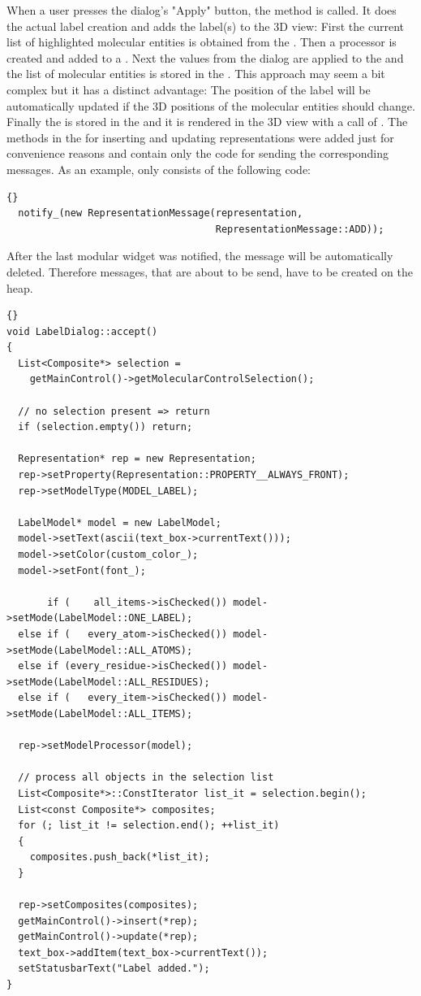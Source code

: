 \vspace{0.5cm}
When a user presses the dialog's "Apply" button, the method  is called.
It does the actual label creation and adds the label(s) to the 3D view:
First the current list of highlighted molecular entities is obtained from
the .
Then a  processor is created and added to a .
Next the values from the dialog are applied to the  and the
list of molecular entities is stored in the .
This approach may seem a bit complex but it has a distinct advantage: The position
of the label will be automatically updated if the 3D positions of the molecular entities 
should change. 
Finally the  is stored in the  and it is rendered
in the 3D view with a call of .
The methods in the  for inserting and updating representations were 
added just for convenience reasons and contain only the code for sending the corresponding 
messages. 
As an example,  only consists of the 
following code:
\begin{lstlisting}{}
  notify_(new RepresentationMessage(representation, 
                                    RepresentationMessage::ADD));
\end{lstlisting}

After the last modular widget was notified, the message will be automatically deleted.
Therefore messages, that are about to be send, have to be created on the heap.
\begin{lstlisting}{}
void LabelDialog::accept()
{
  List<Composite*> selection = 
    getMainControl()->getMolecularControlSelection();

  // no selection present => return
  if (selection.empty()) return;

  Representation* rep = new Representation;
  rep->setProperty(Representation::PROPERTY__ALWAYS_FRONT);
  rep->setModelType(MODEL_LABEL);

  LabelModel* model = new LabelModel;
  model->setText(ascii(text_box->currentText()));
  model->setColor(custom_color_);
  model->setFont(font_);

       if (    all_items->isChecked()) model->setMode(LabelModel::ONE_LABEL);
  else if (   every_atom->isChecked()) model->setMode(LabelModel::ALL_ATOMS);
  else if (every_residue->isChecked()) model->setMode(LabelModel::ALL_RESIDUES);
  else if (   every_item->isChecked()) model->setMode(LabelModel::ALL_ITEMS);

  rep->setModelProcessor(model);

  // process all objects in the selection list
  List<Composite*>::ConstIterator list_it = selection.begin();
  List<const Composite*> composites;
  for (; list_it != selection.end(); ++list_it)
  {
    composites.push_back(*list_it);
  }

  rep->setComposites(composites);
  getMainControl()->insert(*rep);
  getMainControl()->update(*rep);
  text_box->addItem(text_box->currentText());
  setStatusbarText("Label added.");
}
\end{lstlisting}

